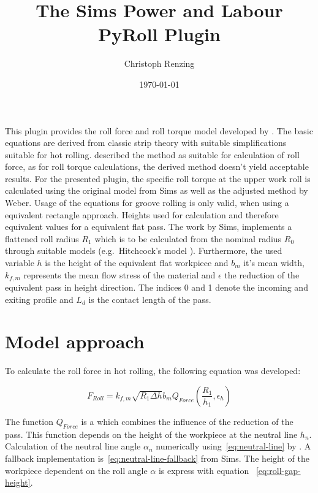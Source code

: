 \documentclass[11pt]{PyRollDocs}
\begin{document}
    \title{The Sims Power and Labour PyRoll Plugin}
    \author{Christoph Renzing}
    \date{\today}

    \maketitle

    This plugin provides the roll force and roll torque model developed by \textcite{Sims1954}.
    The basic equations are derived from classic strip theory with suitable simplifications suitable for hot rolling.
    \textcite{Weber1960, Weber1973} described the method as suitable for calculation of roll force, as for roll torque calculations, the derived method doesn't yield acceptable results.
    For the presented plugin, the specific roll torque at the upper work roll is calculated using the original model from Sims as well as the adjusted method by Weber.
    Usage of the equations for groove rolling is only valid, when using a equivalent rectangle approach.
    Heights used for calculation and therefore equivalent values for a equivalent flat pass.
    The work by Sims, implements a flattened roll radius $R_1$ which is to be calculated from the nominal radius $R_0$ through suitable models (e.g.~Hitchcock's model \textcite{Hitchcook1935}).
    Furthermore, the used variable $h$ is the height of the equivalent flat workpiece and $b_m$ it's mean width, $k_{f,m}$ represents the mean flow stress of the material and $\epsilon$ the reduction of the equivalent pass in height direction.
    The indices 0 and 1 denote the incoming and exiting profile and $L_d$ is the contact length of the pass.


    \section{Model approach}\label{sec:model-approach}

    To calculate the roll force in hot rolling, the following equation was developed:

    \begin{equation}
        F_{Roll} = k_{f, m} \sqrt{R_1 \Delta h} b_m Q_{Force}(\frac{R_1}{h_1}, \epsilon_h)
        \label{eq:sims-force}
    \end{equation}

    The function $Q_{Force}$ is a which combines the influence of the reduction of the pass.
    This function depends on the height of the workpiece at the neutral line $h_{n}$.
    Calculation of the neutral line angle $\alpha_n$ numerically using~\eqref{eq:neutral-line} by \textcite{Sims1954}.
    A fallback implementation is~\eqref{eq:neutral-line-fallback} from Sims.
    The height of the workpiece dependent on the roll angle $\alpha$ is express with equation ~\ref{eq:roll-gap-height}.
\end{document}
